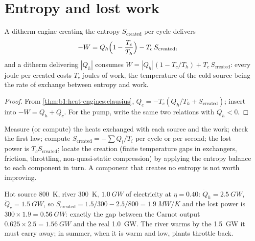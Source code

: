 \section{Entropy and lost work}

\begin{theorem}\label{thm:b1:heat-engines:lostwork}
A ditherm engine creating the entropy $S_{\mathrm{created}}$ per cycle
delivers
\[
-W = Q_h\Bigl(1 - \frac{T_c}{T_h}\Bigr) - T_c\,S_{\mathrm{created}} ,
\]
and a ditherm  delivering $|Q_h|$ consumes
$W = |Q_h|(1 - T_c/T_h) + T_c\,S_{\mathrm{created}}$: every joule per 
created costs $T_c$ joules of work, the temperature of the cold source
being the rate of exchange between entropy and work.
\end{theorem}

\begin{proof}
From \cref{thm:b1:heat-engines:clausius}, $Q_c = -T_c(Q_h/T_h + S_{\mathrm{created}})$;
insert into $-W = Q_h + Q_c$. For the pump, write the same two relations
with $Q_h < 0$.
\end{proof}

\begin{method}\label{meth:b1:heat-engines:audit}
Measure (or compute) the heats exchanged with each source and the work;
check the first law; compute $S_{\mathrm{created}} = -\sum Q_i/T_i$ per cycle
or per second; the lost power is $T_c\dot S_{\mathrm{created}}$; locate the
creation (finite temperature gaps in exchangers, friction, throttling,
non-quasi-static compression) by applying the entropy balance to each
component in turn. A component that creates no entropy is not worth
improving.
\end{method}

\begin{example}\label{ex:b1:heat-engines:audit}
Hot source \qty{800}{K}, river \qty{300}{K}, $\qty{1.0}{GW}$ of electricity
at $\eta = 0.40$: $\dot Q_h = \qty{2.5}{GW}$, $\dot Q_c = \qty{1.5}{GW}$, so
$\dot S_{\mathrm{created}} = 1.5/300 - 2.5/800 = \qty{1.9}{MW/K}$ and the lost
power is $300 \times 1.9 = \qty{0.56}{GW}$: exactly the gap between the
Carnot output $0.625 \times 2.5 = \qty{1.56}{GW}$ and the real \qty{1.0}{GW}.
The river warms by the \qty{1.5}{GW} it must carry away; in summer, when
it is warm and low, plants throttle back.
\end{example}

